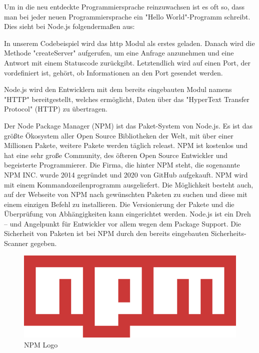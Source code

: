 Um in die neu entdeckte Programmiersprache reinzuwachsen ist es oft so, dass man bei jeder neuen Programmiersprache ein "Hello World"-Programm schreibt. Dies sieht bei Node.js folgendermaßen aus:


In unserem Codebeispiel wird das http Modul als erstes geladen. Danach wird die Methode "createServer" aufgerufen, um eine Anfrage anzunehmen und eine Antwort mit einem Statuscode zurückgibt. Letztendlich wird auf einen Port, der vordefiniert ist, gehört, ob Informationen an den Port gesendet werden.

Node.js wird den Entwicklern mit dem bereits eingebauten Modul namens "HTTP" bereitgestellt, welches ermöglicht, Daten über das "HyperText Transfer Protocol" (HTTP) zu übertragen. \cite{HelloWorld}

\label{sec:npm}

Der Node Package Manager (NPM) ist das Paket-System von Node.js. Es ist das größte Ökosystem aller Open Source Bibliotheken der Welt, mit über einer Millionen Pakete, weitere Pakete werden täglich releast. NPM ist kostenlos und hat eine sehr große Community, des öfteren Open Source Entwickler und begeisterte Programmierer. Die Firma, die hinter NPM steht, die sogenannte NPM INC. wurde 2014 gegründet und 2020 von GitHub aufgekauft.
NPM wird mit einem Kommandozeilenprogramm ausgeliefert. Die Möglichkeit besteht auch, auf der Webseite von NPM nach gewünschten Paketen zu suchen und diese mit einem einzigen Befehl zu installieren. Die Versionierung der Pakete und die Überprüfung von Abhängigkeiten kann eingerichtet werden. Node.js ist ein Dreh – und Angelpunkt für Entwickler vor allem wegen dem Package Support.
Die Sicherheit von Paketen ist bei NPM durch den bereits eingebauten Sicherheits-Scanner gegeben.\cite{NPM} \cite{NPM2}

\begin{figure}[H]
    \centering
    \includegraphics{media/NodeJs/NPM.png}
    \caption{NPM Logo\cite{NPMLOGO}}
\end{figure}

